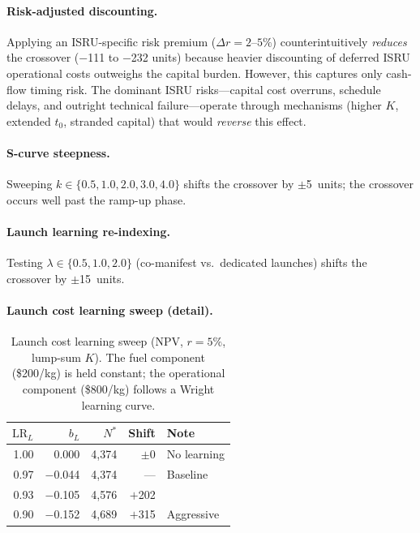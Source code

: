 \documentclass[preprint,12pt]{elsarticle}
\begin{document}
\paragraph{Risk-adjusted discounting.}
\label{sec:risk_premium}
Applying an ISRU-specific risk premium ($\Delta r = 2$--$5\%$) counterintuitively \emph{reduces} the crossover ($-$111 to $-$232 units) because heavier discounting of deferred ISRU operational costs outweighs the capital burden. However, this captures only cash-flow timing risk. The dominant ISRU risks---capital cost overruns, schedule delays, and outright technical failure---operate through mechanisms (higher $K$, extended $t_0$, stranded capital) that would \emph{reverse} this effect.

\paragraph{S-curve steepness.} Sweeping $k \in \{0.5, 1.0, 2.0, 3.0, 4.0\}$ shifts the crossover by $\pm$5~units; the crossover occurs well past the ramp-up phase.

\paragraph{Launch learning re-indexing.} Testing $\lambda \in \{0.5, 1.0, 2.0\}$ (co-manifest vs.\ dedicated launches) shifts the crossover by $\pm$15~units.

\paragraph{Launch cost learning sweep (detail).}

\begin{table}[htbp]
\centering
\caption{Launch cost learning sweep (NPV, $r = 5\%$, lump-sum $K$). The fuel component (\$200/kg) is held constant; the operational component (\$800/kg) follows a Wright learning curve.}
\label{tab:launch_learning}
\small
\begin{tabular}{@{}rrrrl@{}}
\toprule
$\mathrm{LR}_L$ & $b_L$ & $N^*$ & Shift & Note \\
\midrule
1.00 & 0.000  & 4{,}374 & $\pm$0 & No learning \\
0.97 & $-$0.044 & 4{,}374 & ---    & Baseline \\
0.93 & $-$0.105 & 4{,}576 & $+$202 & \\
0.90 & $-$0.152 & 4{,}689 & $+$315 & Aggressive \\
\bottomrule
\end{tabular}
\end{table}
\end{document}
